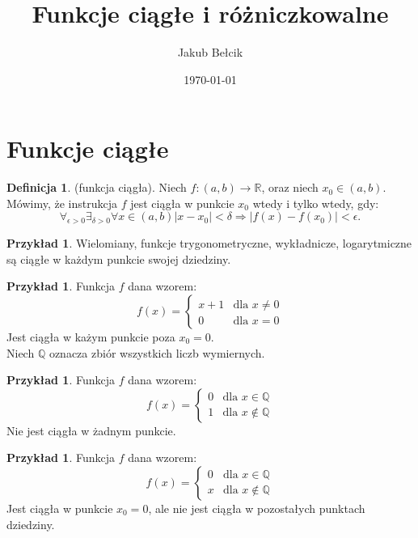 \documentclass[12pt,a4paper]{article}
\title{Funkcje ciągłe i różniczkowalne}
\date{\today}
\author{Jakub Bełcik}
\theoremstyle{definition}
\newtheorem{df}[tw]{Definicja}
\newtheorem{ex}[tw]{Przykład}
\begin{document}
\maketitle

\tableofcontents

\section{Funkcje ciągłe}

\begin{df}
(funkcja ciągła). Niech $f: (a,b) \rightarrow \mathbb{R}$, oraz niech $x_0 \in (a,b)$. Mówimy, że instrukcja $f$ jest ciągła w punkcie $x_0$ wtedy i tylko wtedy, gdy:
\[ \forall_{\epsilon >0}\exists_{\delta >0}\forall x \in (a,b) |x-x_0| < \delta  \Rightarrow  |f(x) - f(x_0)| < \epsilon .\]
\end{df}

\begin{ex}
Wielomiany, funkcje trygonometryczne, wykładnicze, logarytmiczne są ciągłe w każdym punkcie swojej dziedziny.
\end{ex}

\begin{ex}
Funkcja $f$ dana wzorem:
\[ f (x) = \left\{ \begin{array}{ll} x + 1 & \mbox{dla } x \neq  0 \\ 0 & \mbox{dla } x = 0 \end{array} \right. \]
Jest ciągła w każym punkcie poza $x_0 = 0$.
\\ Niech $\mathbb{Q}$ oznacza zbiór wszystkich liczb wymiernych.
\end{ex}

\begin{ex}
Funkcja $f$ dana wzorem:
\[ f (x) = \left\{ \begin{array}{ll} 0 & \mbox{dla } x \in  \mathbb{Q} \\ 1 & \mbox{dla } x \notin  \mathbb{Q} \end{array} \right. \]
Nie jest ciągła w żadnym punkcie.
\end{ex}

\newpage

\begin{ex}
Funkcja $f$ dana wzorem:
\[ f (x) = \left\{ \begin{array}{ll} 0 & \mbox{dla } x \in  \mathbb{Q} \\ x & \mbox{dla } x \notin  \mathbb{Q} \end{array} \right. \]
Jest ciągła w punkcie $x_0 = 0$, ale nie jest ciągła w pozostałych punktach dziedziny.
\end{ex}
\end{document}
